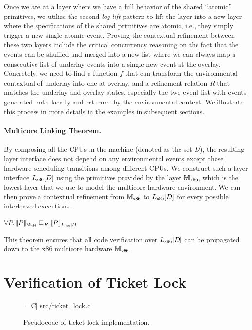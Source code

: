 Once we are at a layer where we have a full behavior of the shared
``atomic'' primitives, we utilize the second \emph{log-lift} pattern to
lift the layer into a new layer where the specifications of the shared
primitives are atomic, i.e., they simply trigger a new single atomic
event. Proving the contextual refinement between these two layers include
the critical concurrency reasoning on the fact that the events can be
shuffled and merged into a new list where we can always map a consecutive
list of underlay events into a single new event at the overlay.
Concretely, we need to find a function $f$ that can transform the environmental
contextual of underlay into one at overlay, and a refinement relation $R$
that matches the underlay and overlay states, especially the two event list
with events generated both locally and returned by the environmental context.
We illustrate this process in more details in the examples in subsequent sections.

\paragraph{Multicore Linking Theorem.}
By composing all the CPUs in the machine (denoted as the set $D$), the resulting 
layer interface does not depend on any environmental events except those
hardware scheduling transitions among different CPUs.
We construct such a layer interface $\PBoot[D]$
using the primitives provided by the layer $\Mach_{\boot}$, which is the lowest
layer that we use to model the multicore hardware environment. 
We can then prove a contextual refinement from  $\Mach_{\boot}$ to $\PBoot[D]$
for every possible interleaved executions.
\begin{theorem}
\label{thm:link}
$\forall P, \sem{\Mach_{\boot}}{P} \refines_R \sem{\PBoot[D]}{P}$
\end{theorem}
This theorem ensures that all code verification over $\PBoot[D]$ can be propagated down to the x86 multicore hardware 
$\Mach_{\boot}$.


\section{Verification of Ticket Lock}
\label{veri-ticket-lock}

\begin{figure}[t]
 = C] {src/ticket_lock.c}
\caption{Pseudocode of ticket lock implementation.}
\label{fig:ticket_lock_c}
\end{figure}

